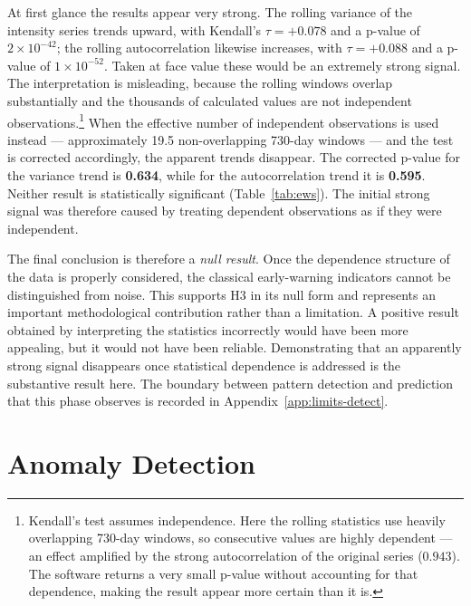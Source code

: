 At first glance the results appear very strong. The rolling variance of the intensity series trends upward, with Kendall's $\tau = +0.078$ and a p-value of $2\times10^{-42}$; the rolling autocorrelation likewise increases, with $\tau = +0.088$ and a p-value of $1\times10^{-52}$. Taken at face value these would be an extremely strong signal. The interpretation is misleading, because the rolling windows overlap substantially and the thousands of calculated values are not independent observations.\footnote{Kendall's test assumes independence. Here the rolling statistics use heavily overlapping 730-day windows, so consecutive values are highly dependent --- an effect amplified by the strong autocorrelation of the original series ($0.943$). The software returns a very small p-value without accounting for that dependence, making the result appear more certain than it is.} When the effective number of independent observations is used instead --- approximately 19.5 non-overlapping 730-day windows --- and the test is corrected accordingly, the apparent trends disappear. The corrected p-value for the variance trend is \textbf{0.634}, while for the autocorrelation trend it is \textbf{0.595}. Neither result is statistically significant (Table~\ref{tab:ews}). The initial strong signal was therefore caused by treating dependent observations as if they were independent.




The final conclusion is therefore a \emph{null result}. Once the dependence structure of the data is properly considered, the classical early-warning indicators cannot be distinguished from noise. This supports H3 in its null form and represents an important methodological contribution rather than a limitation. A positive result obtained by interpreting the statistics incorrectly would have been more appealing, but it would not have been reliable. Demonstrating that an apparently strong signal disappears once statistical dependence is addressed is the substantive result here. The boundary between pattern detection and prediction that this phase observes is recorded in Appendix~\ref{app:limits-detect}.

\section{Anomaly Detection}
\label{sec:detect-anomalies}

